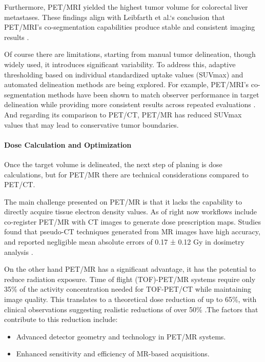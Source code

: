 \documentclass[11pt]{article} %
\begin{document}
\begin{multicols}{2}
Furthermore, PET/MRI yielded the highest tumor volume for colorectal liver metastases. These findings align with Leibfarth et al.‘s %
conclusion that PET/MRI’s co-segmentation capabilities produce stable and consistent imaging results \cite{yan2024}.

Of course there are limitations, starting from manual tumor delineation, though widely used, it introduces significant variability. To address this, adaptive thresholding based on individual standardized uptake values (SUVmax) and automated delineation methods are being explored. For example, PET/MRI’s co-segmentation methods have been shown to match observer performance in target delineation while providing more consistent results across repeated evaluations \cite{yan2024}. And regarding its comparison to PET/CT, PET/MR has reduced SUVmax values that may lead to conservative tumor boundaries.

\paragraph{Dose Calculation and Optimization}
Once the target volume is delineated, the next step of planing is dose calculations, but for PET/MR there are technical considerations compared to PET/CT.

The main challenge presented on PET/MR is that it lacks the capability to directly acquire tissue electron density values. As of right now workflows include co-register PET/MR with CT images to generate dose prescription maps. Studies found that pseudo-CT techniques generated from MR images have high accuracy, and reported negligible mean absolute errors of 0.17 ± 0.12 Gy in dosimetry analysis \cite{yan2024}.

On the other hand PET/MR has a significant advantage, it has the potential to reduce radiation exposure. Time of flight (TOF)-PET/MR systems require only 35\% of the activity concentration needed for TOF-PET/CT while maintaining image quality. This translates to a theoretical dose reduction of up to 65\%, with clinical observations suggesting realistic reductions of over 50\% \cite{Queiroz2015}.The factors that contribute to this reduction include:

\begin{itemize}
    \item Advanced detector geometry and technology in PET/MR systems.
    \item Enhanced sensitivity and efficiency of MR-based acquisitions.
\end{itemize}


\end{multicols}
\end{document}
